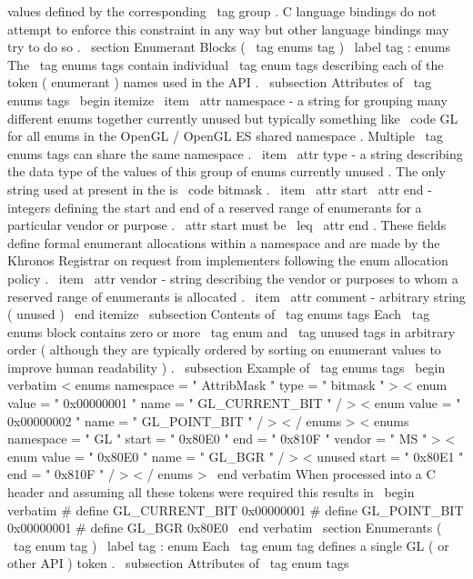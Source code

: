 values
defined
by
the
corresponding
\
tag
{
group
}
.
C
language
bindings
do
not
attempt
to
enforce
this
constraint
in
any
way
but
other
language
bindings
may
try
to
do
so
.
\
section
{
Enumerant
Blocks
(
\
tag
{
enums
}
tag
)
}
\
label
{
tag
:
enums
}
The
\
tag
{
enums
}
tags
contain
individual
\
tag
{
enum
}
tags
describing
each
of
the
token
(
enumerant
)
names
used
in
the
API
.
\
subsection
{
Attributes
of
\
tag
{
enums
}
tags
}
\
begin
{
itemize
}
\
item
\
attr
{
namespace
}
-
a
string
for
grouping
many
different
enums
together
currently
unused
but
typically
something
like
\
code
{
GL
}
for
all
enums
in
the
OpenGL
/
OpenGL
ES
shared
namespace
.
Multiple
\
tag
{
enums
}
tags
can
share
the
same
namespace
.
\
item
\
attr
{
type
}
-
a
string
describing
the
data
type
of
the
values
of
this
group
of
enums
currently
unused
.
The
only
string
used
at
present
in
the
is
\
code
{
bitmask
}
.
\
item
\
attr
{
start
}
\
attr
{
end
}
-
integers
defining
the
start
and
end
of
a
reserved
range
of
enumerants
for
a
particular
vendor
or
purpose
.
\
attr
{
start
}
must
be
\
leq
\
attr
{
end
}
.
These
fields
define
formal
enumerant
allocations
within
a
namespace
and
are
made
by
the
Khronos
Registrar
on
request
from
implementers
following
the
enum
allocation
policy
.
\
item
\
attr
{
vendor
}
-
string
describing
the
vendor
or
purposes
to
whom
a
reserved
range
of
enumerants
is
allocated
.
\
item
\
attr
{
comment
}
-
arbitrary
string
(
unused
)
\
end
{
itemize
}
\
subsection
{
Contents
of
\
tag
{
enums
}
tags
}
Each
\
tag
{
enums
}
block
contains
zero
or
more
\
tag
{
enum
}
and
\
tag
{
unused
}
tags
in
arbitrary
order
(
although
they
are
typically
ordered
by
sorting
on
enumerant
values
to
improve
human
readability
)
.
\
subsection
{
Example
of
\
tag
{
enums
}
tags
}
\
begin
{
verbatim
}
<
enums
namespace
=
"
AttribMask
"
type
=
"
bitmask
"
>
<
enum
value
=
"
0x00000001
"
name
=
"
GL_CURRENT_BIT
"
/
>
<
enum
value
=
"
0x00000002
"
name
=
"
GL_POINT_BIT
"
/
>
<
/
enums
>
<
enums
namespace
=
"
GL
"
start
=
"
0x80E0
"
end
=
"
0x810F
"
vendor
=
"
MS
"
>
<
enum
value
=
"
0x80E0
"
name
=
"
GL_BGR
"
/
>
<
unused
start
=
"
0x80E1
"
end
=
"
0x810F
"
/
>
<
/
enums
>
\
end
{
verbatim
}
When
processed
into
a
C
header
and
assuming
all
these
tokens
were
required
this
results
in
\
begin
{
verbatim
}
#
define
GL_CURRENT_BIT
0x00000001
#
define
GL_POINT_BIT
0x00000001
#
define
GL_BGR
0x80E0
\
end
{
verbatim
}
\
section
{
Enumerants
(
\
tag
{
enum
}
tag
)
}
\
label
{
tag
:
enum
}
Each
\
tag
{
enum
}
tag
defines
a
single
GL
(
or
other
API
)
token
.
\
subsection
{
Attributes
of
\
tag
{
enum
}
tags
}
